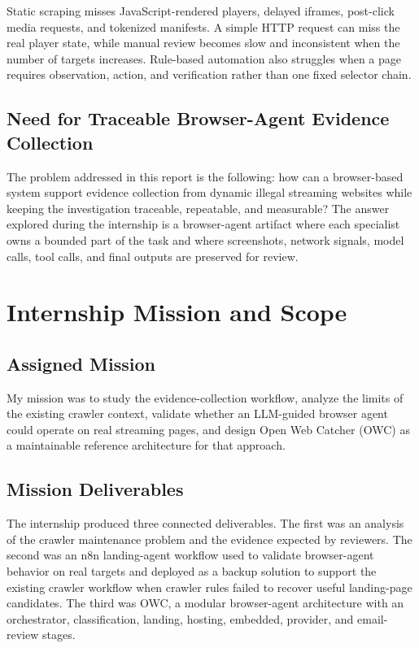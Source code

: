 Static scraping misses JavaScript-rendered players, delayed iframes, post-click
media requests, and tokenized manifests. A simple HTTP request can miss the
real player state, while manual review becomes slow and inconsistent when the
number of targets increases. Rule-based automation also struggles when a page
requires observation, action, and verification rather than one fixed selector
chain.

\subsection{Need for Traceable Browser-Agent Evidence Collection}

The problem addressed in this report is the following: how can a browser-based
system support evidence collection from dynamic illegal streaming websites
while keeping the investigation traceable, repeatable, and measurable? The
answer explored during the internship is a browser-agent artifact where each
specialist owns a bounded part of the task and where screenshots, network
signals, model calls, tool calls, and final outputs are preserved for review.



\section{Internship Mission and Scope}

\subsection{Assigned Mission}

My mission was to study the evidence-collection workflow, analyze the limits of
the existing crawler context, validate whether an LLM-guided browser agent
could operate on real streaming pages, and design Open Web Catcher (OWC) as a
maintainable reference architecture for that approach.

\subsection{Mission Deliverables}

The internship produced three connected deliverables. The first was an analysis
of the crawler maintenance problem and the evidence expected by reviewers. The
second was an n8n landing-agent workflow used to validate browser-agent
behavior on real targets and deployed as a backup solution to support the
existing crawler workflow when crawler rules failed to recover useful
landing-page candidates. The third was OWC, a modular browser-agent
architecture with an orchestrator, classification, landing, hosting, embedded,
provider, and email-review stages.

